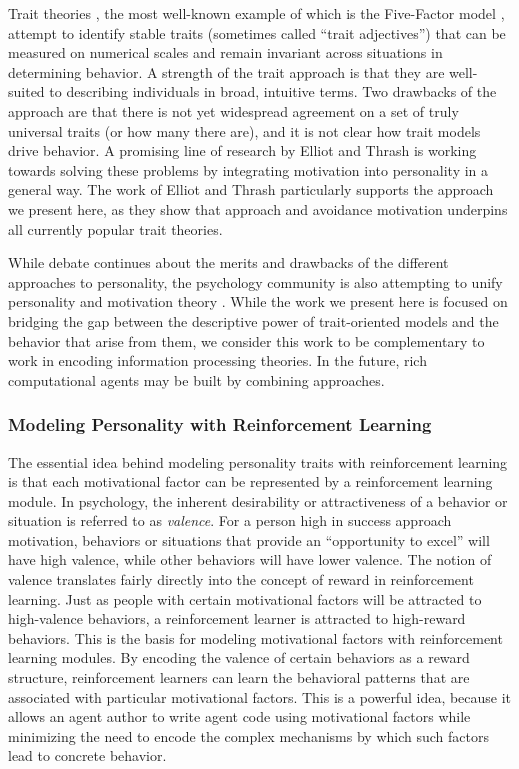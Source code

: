 Trait theories \cite{cervone2009personality}, the most well-known example of which is the Five-Factor model \cite{mccrae2008handbook}, attempt to identify stable traits (sometimes called ``trait adjectives'') that can be measured on numerical scales and remain invariant across situations in determining behavior.  A strength of the trait approach is that they are well-suited to describing individuals in broad, intuitive terms.  Two drawbacks of the approach are that there is not yet widespread agreement on a set of truly universal traits (or how many there are), and it is not clear how trait models drive behavior.  A promising line of research by Elliot and Thrash \cite{elliot2002approach-avoidance} is working towards solving these problems by integrating motivation into personality in a general way.  The work of Elliot and Thrash particularly supports the approach we present here, as they show that approach and avoidance motivation underpins all currently popular trait theories.

While debate continues about the merits and drawbacks of the different approaches to personality, the psychology community is also attempting to unify personality and motivation theory \cite{mischel2008handbook}. While the work we present here is focused on bridging the gap between the descriptive power of trait-oriented models and the behavior that arise from them, we consider this work to be complementary to work in encoding information processing theories.  In the future, rich computational agents may be built by combining approaches.

\subsubsection{Modeling Personality with Reinforcement Learning}

The essential idea behind modeling personality traits with reinforcement learning is that each motivational factor can be represented by a reinforcement learning module.  In psychology, the inherent desirability or attractiveness of a behavior or situation is referred to as {\em valence}.  For a person high in success approach motivation, behaviors or situations that provide an ``opportunity to excel'' will have high valence, while other behaviors will have lower valence.  The notion of valence translates fairly directly into the concept of reward in reinforcement learning.  Just as people with certain motivational factors will be attracted to high-valence behaviors, a reinforcement learner is attracted to high-reward behaviors.  This is the basis for modeling motivational factors with reinforcement learning modules.  By encoding the valence of certain behaviors as a reward structure, reinforcement learners can learn the behavioral patterns that are associated with particular motivational factors.  This is a powerful idea, because it allows an agent author to write agent code using motivational factors while minimizing the need to encode the complex mechanisms by which such factors lead to concrete behavior.

